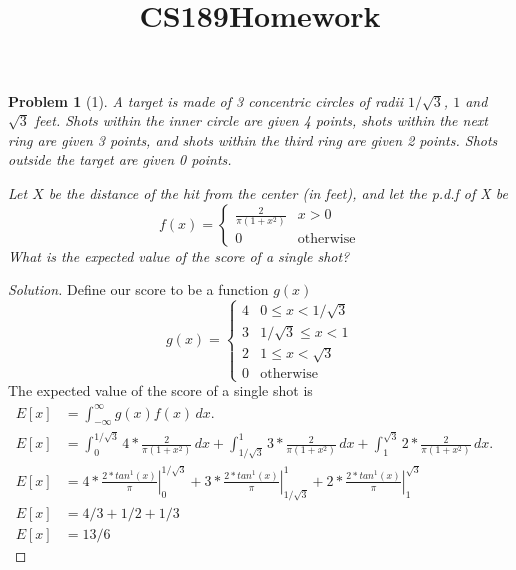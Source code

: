 \documentclass[11pt]{article}
\title{\vspace{-50pt}
\Huge \name
\\\vspace{20pt}
\huge CS189\hfill Homework \hw}
\author{}
\date{}
\theoremstyle{quest}
\newtheorem*{problem}{Problem}
\newenvironment{solution}
  {\begin{mdframed}\begin{proof}[Solution]}
  {\end{proof}\end{mdframed}}
\begin{document}
\maketitle

\begin{problem}[1]
A target is made of 3 concentric circles of radii $1/\sqrt{3}$, $1$ and $\sqrt{3}$ feet. Shots within the inner circle are given 4 points, shots within the next ring are given 3 points, and shots within the third ring are given 2 points. Shots outside the target are given 0 points.

Let $X$ be the distance of the hit from the center (in feet), and let the p.d.f of X be
\[
 f(x) = \begin{cases}
        \frac{2}{\pi(1+x^2)}  & x > 0 \\
        0 & \text{otherwise}
        \end{cases}
\]
What is the expected value of the score of a single shot?
\end{problem}
\begin{solution}
    Define our score to be a function $g(x)$
    \[
     g(x) = \begin{cases}
            4  & 0 \leq x < 1/\sqrt{3} \\
            3  & 1/\sqrt{3} \leq x < 1 \\
            2  & 1 \leq x < \sqrt{3} \\
            0 & \text{otherwise}
            \end{cases}
    \]
    The expected value of the score of a single shot is
    \begin{align*}
    E[x] &= \int_{-\infty}^{\infty} g(x)f(x)\,dx. &\\
    E[x] &= \int_{0}^{1/\sqrt{3}} 4*\frac{2}{\pi(1+x^2)}\,dx + \int_{1/\sqrt{3}}^1 3*\frac{2}{\pi(1+x^2)}\,dx + \int_1^{\sqrt{3}} 2*\frac{2}{\pi(1+x^2)}\,dx. &\\
    E[x] &= 4*\left.\frac{2*tan^1(x)}{\pi}\right\vert_{0}^{1/\sqrt{3}} + 3*\left.\frac{2*tan^1(x)}{\pi}\right\vert_{1/\sqrt{3}}^1 + 2*\left.\frac{2*tan^1(x)}{\pi}\right\vert_1^{\sqrt{3}} &\\
    E[x] &= 4/3 + 1/2 + 1/3 &\\
    E[x] &= 13/6
    \end{align*}
    
\end{solution}
\end{document}
